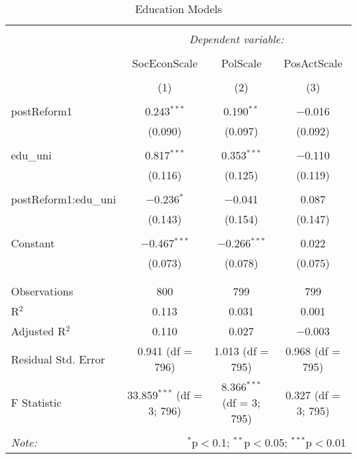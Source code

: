 
\begin{table}[!htbp] \centering 
  \caption{Education Models} 
  \label{} 
\begin{tabular}{@{\extracolsep{5pt}}lccc} 
\\[-1.8ex]\hline 
\hline \\[-1.8ex] 
 & \multicolumn{3}{c}{\textit{Dependent variable:}} \\ 
\cline{2-4} 
\\[-1.8ex] & SocEconScale & PolScale & PosActScale \\ 
\\[-1.8ex] & (1) & (2) & (3)\\ 
\hline \\[-1.8ex] 
 postReform1 & 0.243$^{***}$ & 0.190$^{**}$ & $-$0.016 \\ 
  & (0.090) & (0.097) & (0.092) \\ 
  & & & \\ 
 edu\_uni & 0.817$^{***}$ & 0.353$^{***}$ & $-$0.110 \\ 
  & (0.116) & (0.125) & (0.119) \\ 
  & & & \\ 
 postReform1:edu\_uni & $-$0.236$^{*}$ & $-$0.041 & 0.087 \\ 
  & (0.143) & (0.154) & (0.147) \\ 
  & & & \\ 
 Constant & $-$0.467$^{***}$ & $-$0.266$^{***}$ & 0.022 \\ 
  & (0.073) & (0.078) & (0.075) \\ 
  & & & \\ 
\hline \\[-1.8ex] 
Observations & 800 & 799 & 799 \\ 
R$^{2}$ & 0.113 & 0.031 & 0.001 \\ 
Adjusted R$^{2}$ & 0.110 & 0.027 & $-$0.003 \\ 
Residual Std. Error & 0.941 (df = 796) & 1.013 (df = 795) & 0.968 (df = 795) \\ 
F Statistic & 33.859$^{***}$ (df = 3; 796) & 8.366$^{***}$ (df = 3; 795) & 0.327 (df = 3; 795) \\ 
\hline 
\hline \\[-1.8ex] 
\textit{Note:}  & \multicolumn{3}{r}{$^{*}$p$<$0.1; $^{**}$p$<$0.05; $^{***}$p$<$0.01} \\ 
\end{tabular} 
\end{table} 
